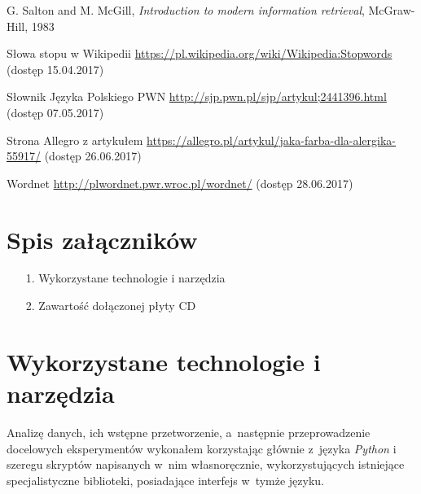 \documentclass[pl]{minipw} %
\begin{document}
\begin{thebibliography}{30}
		G. Salton and M. McGill,
		\emph{Introduction to modern information retrieval},
		McGraw-Hill,
		1983
	
		Słowa stopu w Wikipedii
		\url{https://pl.wikipedia.org/wiki/Wikipedia:Stopwords}
		(dostęp 15.04.2017)
	
		Słownik Języka Polskiego PWN
		\url{http://sjp.pwn.pl/sjp/artykul;2441396.html}
		(dostęp 07.05.2017)
	
		Strona Allegro z artykułem
		\url{https://allegro.pl/artykul/jaka-farba-dla-alergika-55917/}
		(dostęp 26.06.2017)
		
		Wordnet
		\url{http://plwordnet.pwr.wroc.pl/wordnet/}
		(dostęp 28.06.2017)
\end{thebibliography}






\listoffigures


\renewcommand{\listtablename}{Spis tabel}
\listoftables


\chapter*{Spis załączników}
\begin{enumerate}
\item[1.] Wykorzystane technologie i narzędzia
\item[2.] Zawartość dołączonej płyty CD
\end{enumerate}

\newpage
\pagestyle{empty}
\appendix
\chapter{Wykorzystane technologie i narzędzia}
Analizę danych, ich wstępne przetworzenie, a~następnie przeprowadzenie docelowych eksperymentów wykonałem korzystając głównie z~języka \textit{Python} i szeregu skryptów napisanych w~nim własnoręcznie, wykorzystujących istniejące specjalistyczne biblioteki, posiadające interfejs w~tymże języku.
\end{document}
